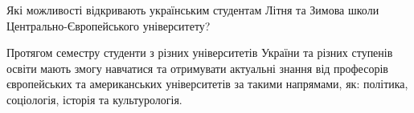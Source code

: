 
Які можливості відкривають українським студентам Літня та Зимова школи Центрально-Європейського університету?

Протягом семестру студенти з різних університетів України та різних ступенів
освіти мають змогу навчатися та отримувати актуальні знання від професорів
європейських та американських університетів за такими напрямами, як: політика,
соціологія, історія та культурологія. 

